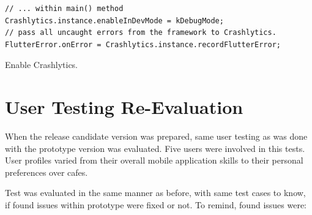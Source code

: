 \begin{listing}[h!]
\begin{verbatim}
// ... within main() method
Crashlytics.instance.enableInDevMode = kDebugMode;
// pass all uncaught errors from the framework to Crashlytics.
FlutterError.onError = Crashlytics.instance.recordFlutterError;
\end{verbatim}
\caption{Enable Crashlytics.}
\label{listing:ct-crashlytics-enable}
\end{listing}

\section{User Testing Re-Evaluation}
When the release candidate version was prepared, same user testing as was done with the prototype version was evaluated. Five users were involved in this tests. User profiles varied from their overall mobile application skills to their personal preferences over cafes. 

Test was evaluated in the same manner as before, with same test cases to know, if found issues within prototype were fixed or not. To remind, found issues were:

